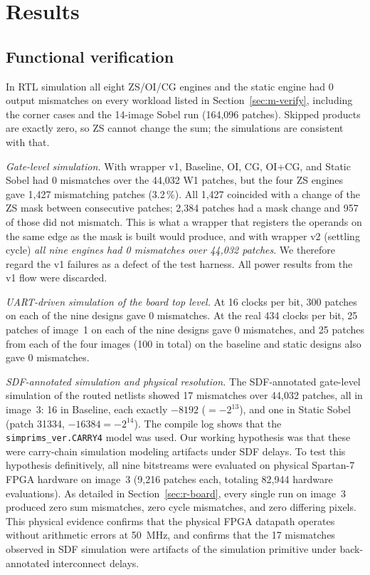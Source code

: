 \documentclass[11pt,journal,draftclsnofoot,onecolumn]{IEEEtran}
\begin{document}
\section{Results}\label{sec:results}
\subsection{Functional verification}\label{sec:r-verify}
In RTL simulation all eight ZS/OI/CG engines and the static engine had 0 output
mismatches on every workload listed in Section~\ref{sec:m-verify}, including the corner
cases and the 14-image Sobel run (164{,}096 patches). Skipped products are exactly zero,
so ZS cannot change the sum; the simulations are consistent with that.

\emph{Gate-level simulation.} With wrapper v1, Baseline, OI, CG, OI+CG, and Static Sobel had
0 mismatches over the 44{,}032 W1 patches, but the four ZS engines gave 1{,}427
mismatching patches (3.2\,\%). All 1{,}427 coincided with a change of the ZS mask between
consecutive patches; 2{,}384 patches had a mask change and 957 of those did not
mismatch. This is what a wrapper that registers the operands on the same edge as the mask
is built would produce, and with wrapper v2 (settling cycle) \emph{all nine engines had 0
mismatches over 44{,}032 patches}. We therefore regard the v1 failures as a defect of the
test harness. All power results from the v1 flow were discarded.

\emph{UART-driven simulation of the board top level.} At 16 clocks per bit, 300 patches
on each of the nine designs gave 0 mismatches. At the real 434 clocks per bit, 25 patches
of image~1 on each of the nine designs gave 0 mismatches, and 25 patches from each of the
four images (100 in total) on the baseline and static designs also gave 0 mismatches.

\emph{SDF-annotated simulation and physical resolution.} The SDF-annotated gate-level simulation of the routed
netlists showed 17 mismatches over 44{,}032 patches, all in image~3: 16 in Baseline, each
exactly $-8192$ ($=-2^{13}$), and one in Static Sobel (patch 31334, $-16384=-2^{14}$). The
compile log shows that the \texttt{simprims\_ver.CARRY4} model was used. Our working
hypothesis was that these were carry-chain simulation modeling artifacts under SDF delays.
To test this hypothesis definitively, all nine bitstreams were evaluated on physical
Spartan-7 FPGA hardware on image~3 (9{,}216 patches each, totaling 82{,}944 hardware
evaluations). As detailed in Section~\ref{sec:r-board}, every single run on image~3 produced
zero sum mismatches, zero cycle mismatches, and zero differing pixels. This physical
evidence confirms that the physical FPGA datapath operates without arithmetic errors at
50~MHz, and confirms that the 17 mismatches observed in SDF simulation were artifacts of
the simulation primitive under back-annotated interconnect delays.
\end{document}
